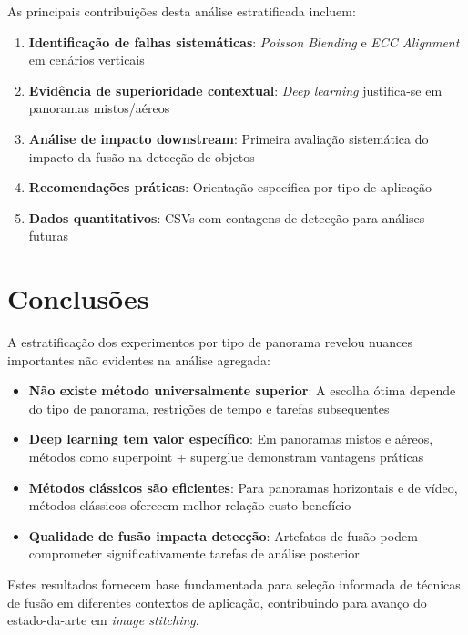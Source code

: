 As principais contribuições desta análise estratificada incluem:

\begin{enumerate}
    \item \textbf{Identificação de falhas sistemáticas}: \textit{Poisson Blending} e \textit{ECC Alignment} em cenários verticais

    \item \textbf{Evidência de superioridade contextual}: \textit{Deep learning} justifica-se em panoramas mistos/aéreos

    \item \textbf{Análise de impacto downstream}: Primeira avaliação sistemática do impacto da fusão na detecção de objetos

    \item \textbf{Recomendações práticas}: Orientação específica por tipo de aplicação

    \item \textbf{Dados quantitativos}: CSVs com contagens de detecção para análises futuras
\end{enumerate}

\section{Conclusões}

A estratificação dos experimentos por tipo de panorama revelou nuances importantes não evidentes na análise agregada:

\begin{itemize}
    \item \textbf{Não existe método universalmente superior}: A escolha ótima depende do tipo de panorama, restrições de tempo e tarefas subsequentes

    \item \textbf{Deep learning tem valor específico}: Em panoramas mistos e aéreos, métodos como \gls{superpoint} + \gls{superglue} demonstram vantagens práticas

    \item \textbf{Métodos clássicos são eficientes}: Para panoramas horizontais e de vídeo, métodos clássicos oferecem melhor relação custo-benefício

    \item \textbf{Qualidade de fusão impacta detecção}: Artefatos de fusão podem comprometer significativamente tarefas de análise posterior
\end{itemize}

Estes resultados fornecem base fundamentada para seleção informada de técnicas de fusão em diferentes contextos de aplicação, contribuindo para avanço do estado-da-arte em \textit{image stitching}.
